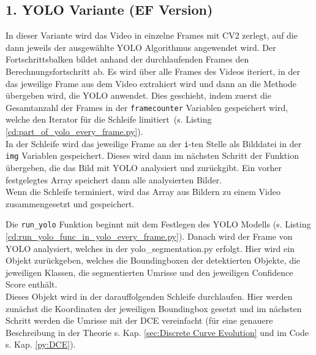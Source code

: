 \subsection{1. YOLO Variante (EF Version)} {
	\label{py:YOLO_every_frame}
	In dieser Variante wird das Video in einzelne Frames mit CV2 zerlegt, auf die dann jeweils der ausgewählte YOLO Algorithmus angewendet wird. Der Fortschrittsbalken bildet anhand der durchlaufenden Frames den Berechnungsfortschritt ab. 
	Es wird über alle Frames des Videos iteriert, in der das jeweilige Frame aus dem Video extrahiert wird und dann an die Methode übergeben wird, die YOLO anwendet. 
	\ifimportant
	\fi	Dies geschieht, indem zuerst die Gesamtanzahl der Frames in der \lstinline|framecounter| Variablen gespeichert wird, welche den Iterator für die Schleife limitiert\ifimportant \ (s. Listing \ref{cd:part_of_yolo_every_frame.py})\fi. \\ 
	In der Schleife wird das jeweilige Frame an der \lstinline|i|-ten Stelle als Bilddatei in der \lstinline|img| Variablen gespeichert. Dieses wird dann im nächsten Schritt der Funktion übergeben, die das Bild mit YOLO analysiert und zurückgibt. Ein vorher festgelegtes Array speichert dann alle analysierten Bilder. \\ 
	Wenn die Schleife terminiert, wird das Array aus Bildern zu einem Video zusammengesetzt und gespeichert. \\
	\ifimportant
	
	\fi Die \lstinline|run_yolo| Funktion beginnt mit dem Festlegen des YOLO Modells \ifimportant (s. Listing \ref{cd:run_yolo_func_in_yolo_every_frame.py})\fi. Danach wird der Frame von YOLO analysiert, welches in der yo\-lo\-\_seg\-men\-tat\-ion.py erfolgt. Hier wird ein Objekt zurückgeben, welches die Boundingboxen der detektierten Objekte, die jeweiligen Klassen, die segmentierten Umrisse und den jeweiligen Confidence Score enthält. \\
	Dieses Objekt wird in der darauffolgenden Schleife durchlaufen. Hier werden zunächst die Koordinaten der jeweiligen Boundingbox gesetzt und im nächsten Schritt werden die Umrisse mit der DCE vereinfacht (für eine genauere Beschreibung in der Theorie s. Kap. \ref{sec:Discrete Curve Evolution} und im Code s. Kap. \ref{py:DCE}). 
}
